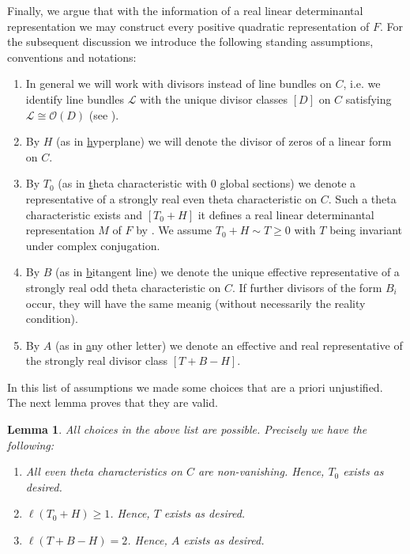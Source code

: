 \documentclass[a4paper,10pt]{amsart}
\theoremstyle{definition}
\theoremstyle{plain}
\newtheorem{lem}[Def]{Lemma}
\newcommand{\cL}{{\mathcal L}}
\newcommand{\cO}{{\mathcal O}}
\begin{document}
Finally, we argue that with the information of a real linear determinantal representation we may construct every positive quadratic representation of $F$. For the subsequent discussion we introduce the following standing assumptions, conventions and notations:
\begin{enumerate}
    \item In general we will work with divisors instead of line bundles on $C$, i.e. we identify line bundles $\cL$ with the unique divisor classes $[D]$ on $C$ satisfying $\cL \cong \cO(D)$ (see \cite[Corollary II.6.16]{Hart77}).

    \item By $H$ (as in \underline{h}yperplane) we will denote the divisor of zeros of a linear form on $C$.
    
    \item By $T_0$ (as in \underline{t}heta characteristic with \underline{$0$} global sections) we denote a representative of a strongly real even theta characteristic on $C$. Such a theta characteristic exists and $[T_0 + H]$ it defines a real linear determinantal representation $M$ of $F$ by . We assume $T_0 + H \sim T \geq 0$ with $T$ being invariant under complex conjugation.

    \item By $B$ (as in \underline{b}itangent line) we denote the unique effective representative of a strongly real odd theta characteristic on $C$. If further divisors of the form $B_i$ occur, they will have the same meanig (without necessarily the reality condition).

    \item By $A$ (as in \underline{a}ny other letter) we denote an effective and real representative of the strongly real divisor class $[T + B - H]$.
\end{enumerate}

In this list of assumptions we made some choices that are a priori unjustified. The next lemma proves that they are valid.

\begin{lem} \label{lem:validchoice}
    All choices in the above list are possible. Precisely we have the following:
    \begin{enumerate}
        \item All even theta characteristics on $C$ are non-vanishing. Hence, $T_0$ exists as desired.

        \item $\ell(T_0 + H) \geq 1$. Hence, $T$ exists as desired.

        \item $\ell(T + B - H) = 2$. Hence, $A$ exists as desired.
    \end{enumerate}
\end{lem}
\end{document}
